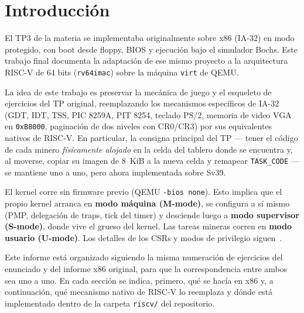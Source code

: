 \section{Introducción}

El TP3 de la materia se implementaba originalmente sobre x86 (IA-32) en modo protegido, con boot desde floppy, BIOS y
ejecución bajo el simulador Bochs. Este trabajo final documenta la adaptación de ese mismo proyecto a la arquitectura
RISC-V de 64 bits (\texttt{rv64imac}) sobre la máquina \texttt{virt} de QEMU.

La idea de este trabajo es preservar la mecánica de juego y el esqueleto de ejercicios del TP original,
reemplazando los mecanismos específicos de IA-32 (GDT, IDT, TSS, PIC 8259A, PIT 8254, teclado PS/2, memoria de video VGA
en \texttt{0xB8000}, paginación de dos niveles con CR0/CR3) por sus equivalentes nativos de RISC-V. En particular, la
consigna principal del TP --- tener el código de cada minero \emph{físicamente alojado} en la celda del tablero donde
se encuentra y, al moverse, copiar su imagen de 8~KiB a la nueva celda y remapear \texttt{TASK\_CODE} --- se mantiene
uno a uno, pero ahora implementada sobre Sv39.

El kernel corre sin firmware previo (QEMU \texttt{-bios none}). Esto implica que el propio kernel arranca en
\textbf{modo máquina (M-mode)}, se configura a sí mismo (PMP, delegación de traps, tick del timer) y desciende luego a
\textbf{modo supervisor (S-mode)}, donde vive el grueso del kernel. Las tareas mineras corren en \textbf{modo usuario
(U-mode)}. Los detalles de los CSRs y modos de privilegio siguen~\cite{riscv-priv}.

Este informe está organizado siguiendo la misma numeración de ejercicios del enunciado y del informe x86 original, para
que la correspondencia entre ambos sea uno a uno. En cada sección se indica, primero, qué se hacía en x86 y, a
continuación, qué mecanismo nativo de RISC-V lo reemplaza y dónde está implementado dentro de la carpeta \texttt{riscv/} del
repositorio.
